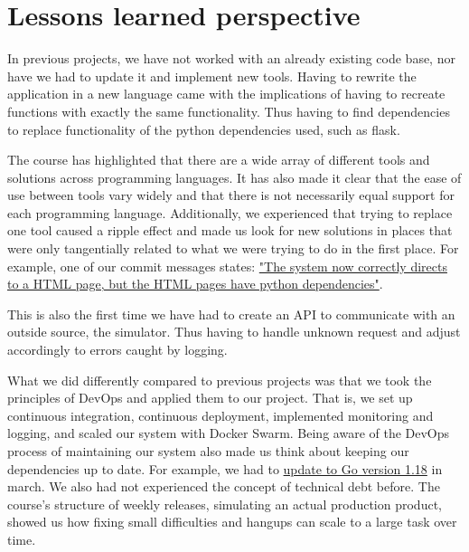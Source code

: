 \section{Lessons learned perspective}

In previous projects, we have not worked with an already existing code base, nor have we had to update it and implement new tools. Having to rewrite the application in a new language came with the implications of having to recreate functions with exactly the same functionality. Thus having to find dependencies to replace functionality of the python dependencies used, such as flask.


The course has highlighted that there are a wide array of different tools and solutions across programming languages. It has also made it clear that the ease of use between tools vary widely and that there is not necessarily equal support for each programming language. Additionally, we experienced that trying to replace one tool caused a ripple effect and made us look for new solutions in places that were only tangentially related to what we were trying to do in the first place. For example, one of our commit messages states: \href{https://github.com/salsitu/minitwit_thesvindler/commit/b0a6703feba3e1e3453358d563e0cce79fe8b6e3}{"The system now correctly directs to a HTML page, but the HTML pages have python dependencies"}.


This is also the first time we have had to create an API to communicate with an outside source, the simulator. Thus having to handle unknown request and adjust accordingly to errors caught by logging.


What we did differently compared to previous projects was that we took the principles of DevOps and applied them to our project. That is, we set up continuous integration, continuous deployment, implemented monitoring and logging, and scaled our system with Docker Swarm. Being aware of the DevOps process of maintaining our system also made us think about keeping our dependencies up to date. For example, we had to \href{https://github.com/salsitu/minitwit_thesvindler/commit/7785e42ec56e38445815946b7efa980dc9502044}{ update to Go version 1.18} in march.
We also had not experienced the concept of technical debt before. The course's structure of weekly releases, simulating an actual production product, showed us how fixing small difficulties and hangups can scale to a large task over time.


